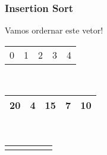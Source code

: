 \documentclass{beamer}
\begin{document}
\begin{frame}
    \frametitle{Insertion Sort}
    \begin{center}
        \LARGE{Vamos ordernar este vetor!}
    \end{center}
    \begin{center}
        \begin{table}
            \begin{tabular}{p{0.25cm} p{0.25cm} p{0.25cm} p{0.25cm} p{0.25cm}}
                0 & 1 & 2 & 3 & 4
            \end{tabular} \\
            \begin{tabular}{| p{0.25cm} | p{0.25cm} | p{0.25cm} | p{0.25cm} | p{0.25cm} |}
                \hline
                20 & 4 & 15 & 7 & 10 \\ \hline
            \end{tabular} \\
            \begin{tabular}{p{0.25cm} p{0.25cm} p{0.25cm} p{0.25cm} p{0.25cm}}
                & & & &
            \end{tabular} \\
            \begin{tabular}{| p{0.25cm} | p{0.25cm} | p{0.25cm} | p{0.25cm} | p{0.25cm} |}
                \hline
                 & & & & \\ \hline
            \end{tabular}
        \end{table}
	\end{center}
\end{frame}
\end{document}
